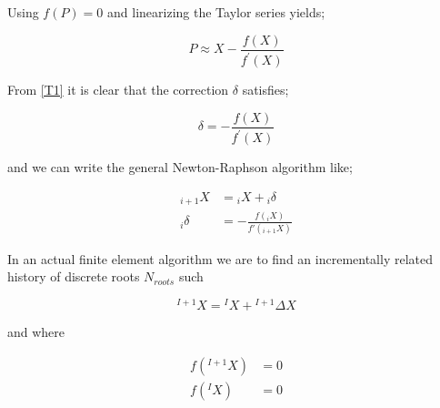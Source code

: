 Using $f(P) = 0$ and linearizing the Taylor series yields;

\begin{equation}
P \approx X - \frac{{f(X)}}{{{f^{'}}(X)}}
\label{T2}
\end{equation}

From \cref{T1} it is clear that the correction $\delta$ satisfies;

\[\delta  =  - \frac{{f(X)}}{{{f^{'}}(X)}}\]

and we can write the general Newton-Raphson algorithm like;

\begin{equation}
\begin{aligned}
{}_{i + 1}X &= {}_iX + {}_i\delta \\
{}_i\delta & =  - \frac{{f({}_iX)}}{{f'({}_{i + 1}X)}}
\label{T3}
\end{aligned}
\end{equation}

In an actual finite element algorithm we are to find an incrementally related history of discrete roots ${N_{roots}}$ such

\begin{equation}
{}^{I + 1}X = {}^IX + {}^{I + 1}\Delta X
\label{IN-1}
\end{equation}

and where

\begin{equation}
\begin{aligned}
f({}^{I + 1}X)& = 0\\
f({}^IX)& = 0
\label{R1}
\end{aligned}
\end{equation}
